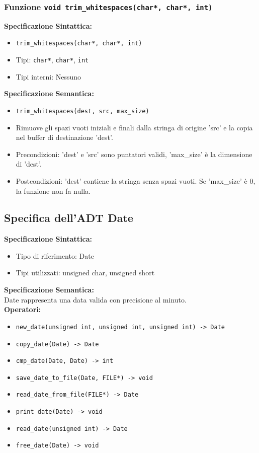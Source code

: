 \documentclass[11pt]{scrartcl} %
\begin{document}
\subsubsection{Funzione \texttt{void trim\_whitespaces(char*, char*, int)}}

\textbf{Specificazione Sintattica:}
\begin{itemize}
	\item \texttt{trim\_whitespaces(char*, char*, int)}
	\item Tipi: \texttt{char*}, \texttt{char*}, \texttt{int}
	\item Tipi interni: Nessuno
\end{itemize}

\textbf{Specificazione Semantica:}
\begin{itemize}
	\item \texttt{trim\_whitespaces(dest, src, max\_size)}
	\item Rimuove gli spazi vuoti iniziali e finali dalla stringa di origine 'src' e la copia nel buffer di destinazione 'dest'.
	\item Precondizioni: 'dest' e 'src' sono puntatori validi, 'max\_size' è la dimensione di 'dest'.
	\item Postcondizioni: 'dest' contiene la stringa senza spazi vuoti. Se 'max\_size' è 0, la funzione non fa nulla.
\end{itemize}

\subsection{Specifica dell'ADT Date}


\textbf{Specificazione Sintattica:}
\begin{itemize}
	\item Tipo di riferimento: Date
	\item Tipi utilizzati: unsigned char, unsigned short
\end{itemize}

\textbf{Specificazione Semantica:} \\
Date rappresenta una data valida con precisione al minuto. \\

\textbf{Operatori:} 
\begin{itemize}
    \item \texttt{new\_date(unsigned int, unsigned int, unsigned int) -> Date}
    \item \texttt{copy\_date(Date) -> Date}
    \item \texttt{cmp\_date(Date, Date) -> int}
    \item \texttt{save\_date\_to\_file(Date, FILE*) -> void}
    \item \texttt{read\_date\_from\_file(FILE*) -> Date}
    \item \texttt{print\_date(Date) -> void}
    \item \texttt{read\_date(unsigned int) -> Date}
    \item \texttt{free\_date(Date) -> void}
\end{itemize}
\end{document}
